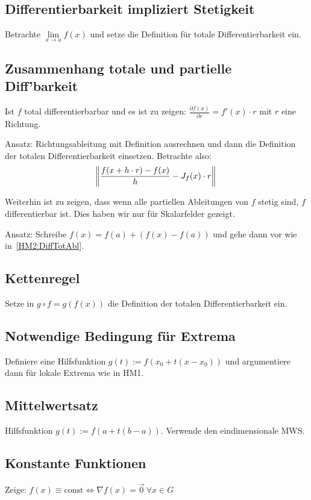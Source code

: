 \subsection{Differentierbarkeit impliziert Stetigkeit}
Betrachte $ \lim\limits_{x \to a}{f(x)}$ und setze die Definition für
totale Differentierbarkeit ein.

\subsection{Zusammenhang totale und partielle Diff'barkeit}
Ist $f$ total differentierbarbar und es ist zu zeigen: $\frac{\partial f(x)}{\partial r} = f'(x) \cdot r$
mit $r$ eine Richtung.

\vspace{0.5cm}

Ansatz: Richtungsableitung mit Definition ausrechnen und dann die Definition der
totalen Differentierbarkeit einsetzen. Betrachte also:
\begin{equation*}
  \norm{\frac{f(x+h \cdot r) - f(x)}{h} - J_f(x) \cdot r}
\end{equation*}

\vspace{0.5cm}

Weiterhin ist zu zeigen, dass wenn alle partiellen Ableitungen von $f$ stetig sind,
$f$ differentierbar ist. Dies haben wir nur für Skalarfelder gezeigt.

Ansatz: Schreibe $f(x) = f(a) + (f(x) - f(a))$ und gehe dann vor wie in~\ref{HM2:DiffTotAbl}.

\subsection{Kettenregel}
Setze in $g \circ f = g(f(x))$ die Definition der totalen Differentierbarkeit ein.

\subsection{Notwendige Bedingung für Extrema}
Definiere eine Hilfsfunktion $g(t):=f(x_0 + t(x-x_0))$ und argumentiere dann
für lokale Extrema wie in HM1.

\subsection{Mittelwertsatz}
Hilfsfunktion $g(t):=f(a + t(b-a))$. Verwende den eindimensionale MWS.

\subsection{Konstante Funktionen}
Zeige: $f(x) \equiv \text{const} \Leftrightarrow \nabla f(x) = \vec{0} \ \forall x \in G$

